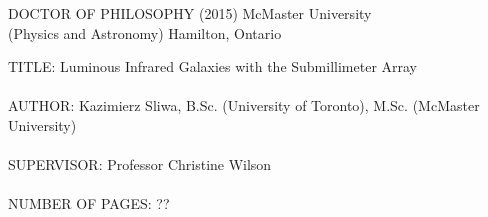 





\pagestyle{empty}
\vspace*{0.5in}

\noindent 
DOCTOR OF PHILOSOPHY (2015) \hspace{2.0cm} McMaster University \\
(Physics and Astronomy)     \hspace{4.2cm} Hamilton, Ontario 
\vspace{0.5in}

\noindent
TITLE: Luminous Infrared Galaxies with the Submillimeter Array\\ \\
AUTHOR: Kazimierz Sliwa, B.Sc. (University of Toronto), M.Sc. (McMaster University)\\ \\
SUPERVISOR: Professor Christine Wilson\\ \\
NUMBER OF PAGES: ??


